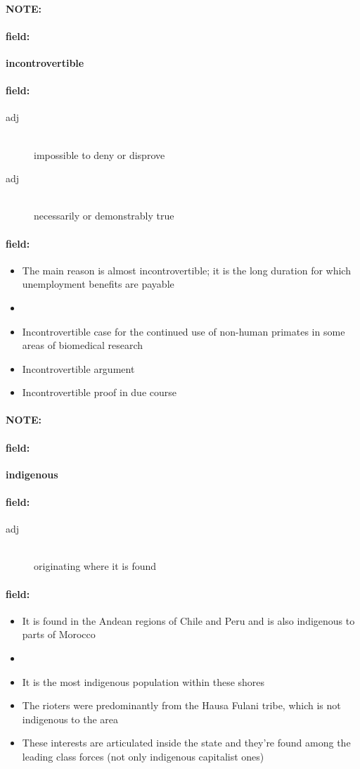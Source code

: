 \documentclass[12pt]{article}
\newenvironment{note}{\paragraph{NOTE:}}{}
\newenvironment{field}{\paragraph{field:}}{}
\begin{document}
\begin{note}
\begin{field}
\textbf{\large incontrovertible}
\end{field}


\begin{field}
\begin{description}
\item[adj] \hfill \\ 
impossible to deny or disprove

\item[adj] \hfill \\ 
necessarily or demonstrably true

\end{description}
\end{field}

\begin{field}
\begin{itemize}
\item The main reason is almost incontrovertible; it is the long duration for which unemployment benefits are payable
\item 
\item Incontrovertible case for the continued use of non-human primates in some areas of biomedical research
\item Incontrovertible argument
\item Incontrovertible proof in due course
\end{itemize}
\end{field}
\end{note}
\begin{note}
\begin{field}
\textbf{\large indigenous}
\end{field}


\begin{field}
\begin{description}
\item[adj] \hfill \\ 
originating where it is found

\end{description}
\end{field}

\begin{field}
\begin{itemize}
\item It is found in the Andean regions of Chile and Peru and is also indigenous to parts of Morocco
\item 
\item It is the most indigenous population within these shores
\item The rioters were predominantly from the Hausa Fulani tribe, which is not indigenous to the area
\item These interests are articulated inside the state and they're found among the leading class forces (not only indigenous capitalist ones)
\end{itemize}
\end{field}
\end{note}
\end{document}
